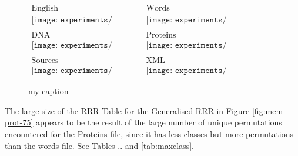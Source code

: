 \begin{figure}[h]
\begin{center}$
\begin{array}{cc}
\mbox{English} & \mbox{Words} \\
\texttt{[image: experiments/unique\_english]} &
\texttt{[image: experiments/unique\_english\_ints]} \\ \\
\mbox{DNA} & \mbox{Proteins} \\ 
\texttt{[image: experiments/unique\_dna]} &
\texttt{[image: experiments/unique\_proteins]} \\ \\
\mbox{Sources} & \mbox{XML} \\
\texttt{[image: experiments/unique\_sources]} &
\texttt{[image: experiments/unique\_dblp\_xml]}
\end{array}$
\end{center}
\caption{my caption}
\label{fig:unique}
\end{figure}
		

The large size of the RRR Table for the Generalised RRR in Figure 
\ref{fig:mem-prot-75} appears to be the result of the large number of unique
permutations encountered for the Proteins file, since it has less classes but 
more permutations than the words file. See Tables .. and \ref{tab:maxclass}.


